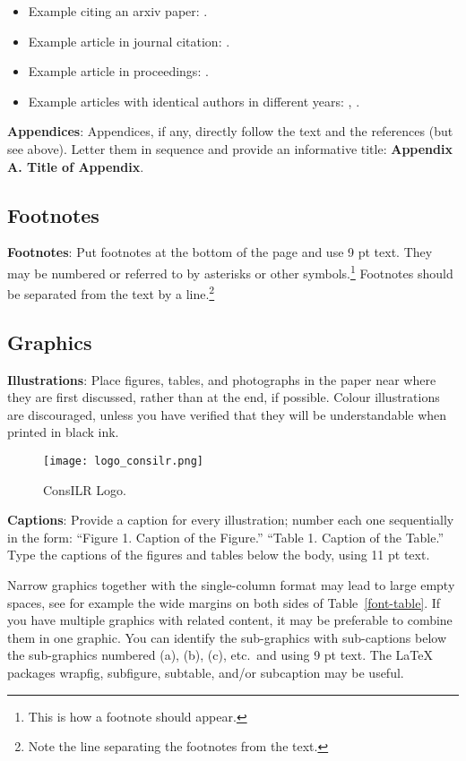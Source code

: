 \documentclass[11pt]{article}
\begin{document}
\begin{itemize}
	\item Example citing an arxiv paper: \cite{rasooli-tetrault-2015}.
	\item Example article in journal citation: \cite{Aho:72}.
	\item Example article in proceedings: \cite{borsch2011}.
    \item Example articles with identical authors in different years: \cite{haja2017b}, \cite{haja2017a}.
\end{itemize}

{\bf Appendices}: Appendices, if any, directly follow the text and the
references (but see above).  Letter them in sequence and provide an
informative title: {\bf Appendix A. Title of Appendix}.

\subsection{Footnotes}

{\bf Footnotes}: Put footnotes at the bottom of the page and use 9 pt
text. They may be numbered or referred to by asterisks or other
symbols.\footnote{This is how a footnote should appear.} Footnotes
should be separated from the text by a line.\footnote{Note the line
separating the footnotes from the text.}

\subsection{Graphics}


{\bf Illustrations}: Place figures, tables, and photographs in the
paper near where they are first discussed, rather than at the end, if
possible.
Colour
illustrations are discouraged, unless you have verified that
they will be understandable when printed in black ink.

\begin{figure}[h]
\centering
  \texttt{[image: logo\_consilr.png]}
  \caption{ConsILR Logo.}
  \label{logo}
\end{figure}

{\bf Captions}: Provide a caption for every illustration; number each one
sequentially in the form:  ``Figure 1. Caption of the Figure.'' ``Table 1.
Caption of the Table.''  Type the captions of the figures and
tables below the body, using 11 pt text.

Narrow graphics together with the single-column format may lead to
large empty spaces,
see for example the wide margins on both sides of Table~\ref{font-table}.
If you have multiple graphics with related content, it may be
preferable to combine them in one graphic.
You can identify the sub-graphics with sub-captions below the
sub-graphics numbered (a), (b), (c), etc.\ and using 9 pt text.
The \LaTeX{} packages wrapfig, subfigure, subtable, and/or subcaption
may be useful.
\end{document}
